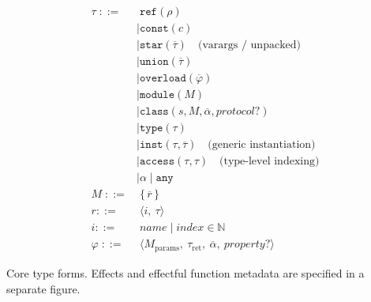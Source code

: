 

\begin{align*}
\tau \;::=&\; \texttt{ref}(\rho)
  \\ &  \mid \texttt{const}(c)
  \\ &  \mid \texttt{star}(\overline{\tau}) \quad \text{(varargs / unpacked)}
\\ & \mid \texttt{union}(\overline{\tau})
 \\ &  \mid \texttt{overload}(\overline{\varphi})
 \\ &  \mid \texttt{module}(M)
 \\ &  \mid \texttt{class}(s, M, \overline{\alpha}, \textit{protocol?})
\\ & \mid \texttt{type}(\tau)
  \\ &  \mid \texttt{inst}(\tau, \overline{\tau}) \quad \text{(generic instantiation)}
   \\ & \mid \texttt{access}(\tau,\tau) \quad \text{(type-level indexing)}
\\ & \mid \alpha \mid \texttt{any}
\\[0.5ex]
M \;::=&\; \{\, \overline{r} \,\}
\\
r ::= &\; \langle i,\ \tau \rangle
\\
i ::= &\; \textit{name} \mid \textit{index} \in \mathbb{N}
\\[0.5ex]
\varphi \;::=&\; \langle M_{\text{params}},\ \tau_{\text{ret}},\ \overline{\alpha},\ \textit{property?} \rangle
\end{align*}
\caption{Core type forms. Effects and effectful function metadata are specified in a separate figure.}
\label{fig:types-core}
